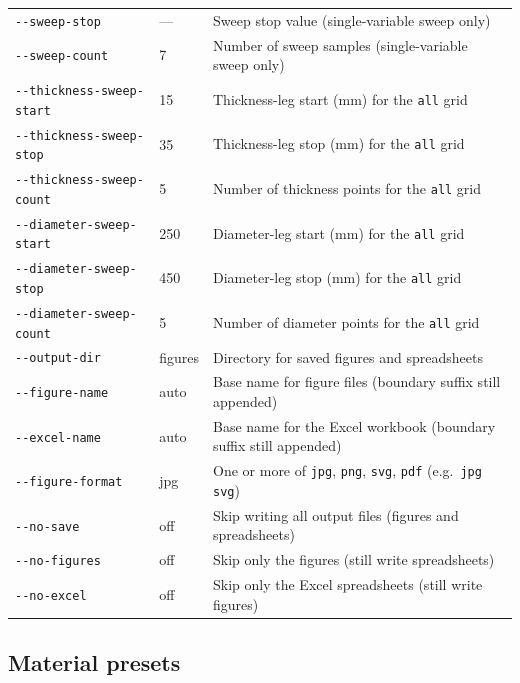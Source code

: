 \documentclass[11pt]{article}
\newcommand{\codeus}{\textunderscore\allowbreak}
\DeclareRobustCommand{\code}[1]{\texttt{\ifmmode\else\renewcommand{\_}{\codeus}\fi#1}}
\begin{document}
\begin{table}[h]
\begin{tabular}{@{}l l p{8.2cm}@{}}
    \code{-{}-sweep-stop}          & ---     & Sweep stop value (single-variable sweep only) \\
    \code{-{}-sweep-count}         & 7       & Number of sweep samples (single-variable sweep only) \\
    \code{-{}-thickness-sweep-start} & 15    & Thickness-leg start (\unit{\milli\meter}) for the \code{all} grid \\
    \code{-{}-thickness-sweep-stop}  & 35    & Thickness-leg stop (\unit{\milli\meter}) for the \code{all} grid \\
    \code{-{}-thickness-sweep-count} & 5     & Number of thickness points for the \code{all} grid \\
    \code{-{}-diameter-sweep-start}  & 250   & Diameter-leg start (\unit{\milli\meter}) for the \code{all} grid \\
    \code{-{}-diameter-sweep-stop}   & 450   & Diameter-leg stop (\unit{\milli\meter}) for the \code{all} grid \\
    \code{-{}-diameter-sweep-count}  & 5     & Number of diameter points for the \code{all} grid \\
    \code{-{}-output-dir}          & figures & Directory for saved figures and spreadsheets \\
    \code{-{}-figure-name}         & auto    & Base name for figure files (boundary suffix still appended) \\
    \code{-{}-excel-name}          & auto    & Base name for the Excel workbook (boundary suffix still appended) \\
    \code{-{}-figure-format}       & jpg     & One or more of \code{jpg}, \code{png}, \code{svg}, \code{pdf} (e.g.\ \code{jpg svg}) \\
    \code{-{}-no-save}             & off     & Skip writing all output files (figures and spreadsheets) \\
    \code{-{}-no-figures}          & off     & Skip only the figures (still write spreadsheets) \\
    \code{-{}-no-excel}            & off     & Skip only the Excel spreadsheets (still write figures) \\
    \bottomrule
  \end{tabular}
\end{table}

\subsection{Material presets}
\label{sec:materials}
\end{document}
